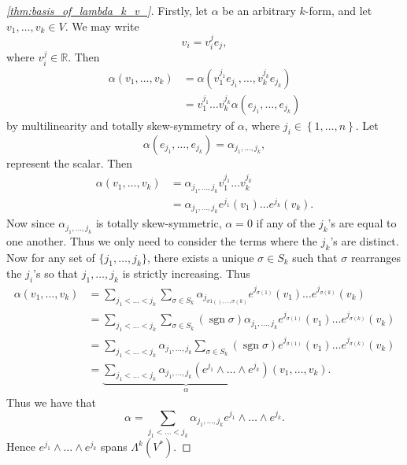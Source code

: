 \documentclass[notoc,notitlepage]{tufte-book}
\DeclareMathOperator{\sgn}{sgn}
\begin{document}
\begin{proof}[\cref{thm:basis_of_lambda_k_v_}]
  Firstly, let $\alpha$ be an arbitrary $k$-form, and let $v_1, \ldots, v_k \in V$. We
  may write
  \begin{equation*}
    v_i = v_i^j e_j,
  \end{equation*}
  where $v_i^j \in \mathbb{R}$. Then
  \begin{align*}
    \alpha(v_1, \ldots, v_k) &= \alpha\left(v_1^{j_1} e_{j_1}, \ldots, v_k^{j_k} e_{j_k}\right) \\
                             &= v_1^{j_1} \hdots v_k^{j_k} \alpha ( e_{j_1}, \ldots, e_{j_k} )
  \end{align*}
  by multilinearity and totally skew-symmetry of $\alpha$, where
  $j_i \in \left\{ 1, \ldots, n \right\}$. Let
  \begin{equation}\label{eq:another_alt_of_a_k_form_scalar}
    \alpha(e_{j_1}, \ldots, e_{j_k}) = \alpha_{j_1, \ldots, j_k},
  \end{equation}
  represent the scalar. Then
  \begin{align*}
    \alpha(v_1, \ldots, v_k) &= \alpha_{j_1, \ldots, j_k} v_1^{j_1} \hdots v_k^{j_k} \\
                             &= \alpha_{j_1, \ldots, j_k} e^{j_1}(v_1) \hdots e^{j_k}(v_k).
  \end{align*}
  Now since $\alpha_{j_1, \ldots, j_k}$ is totally skew-symmetric, $\alpha = 0$ if any of the
  $j_k$'s are equal to one another. Thus we only need to consider the terms where the $j_k$'s
  are distinct. Now for any set of $\{ j_1, \ldots, j_k \}$, there exists a unique
  $\sigma \in S_k$ such that $\sigma$ rearranges the $j_i$'s so that $j_1, \ldots, j_k$ is
  strictly increasing. Thus
  \begin{align*}
    \alpha(v_1, \ldots, v_k)
      &= \sum_{j_1 < \hdots < j_k} \sum_{\sigma \in S_k} \alpha_{j_{\sigma1(), \ldots, \sigma(k)}}
        e^{j_{\sigma(1)}} (v_1) \hdots e^{j_{\sigma(k)}} (v_k) \\
      &= \sum_{j_1 < \hdots < j_k} \sum_{\sigma \in S_k} (\sgn \sigma) \alpha_{j_1, \ldots, j_k}
        e^{j_{\sigma(1)}} (v_1) \hdots e^{j_{\sigma(k)}} (v_k) \\
      &= \sum_{j_1 < \hdots < j_k} \alpha_{j_1, \ldots, j_k} \sum_{\sigma \in S_k} (\sgn \sigma)
        e^{j_{\sigma(1)}} (v_1) \hdots e^{j_{\sigma(k)}} (v_k) \\
      &= \underbrace{ \sum_{j_1 < \hdots < j_k}
          \alpha_{j_1, \ldots, j_k} \left( e^{j_1} \land \hdots \land e^{j_k} \right)
        }_{\alpha}
        (v_1, \ldots, v_k).
  \end{align*}
  Thus we have that
  \begin{equation}\label{eq:k_form_in_general}
    \alpha = \sum_{j_1 < \hdots < j_k} \alpha_{j_1, \ldots, j_k} e^{j_1} \land \hdots \land e^{j_k}.
  \end{equation}
  Hence $e^{j_1} \land \hdots \land e^{j_k}$ spans $\Lambda^k(V^*)$.


\end{proof}
\end{document}
